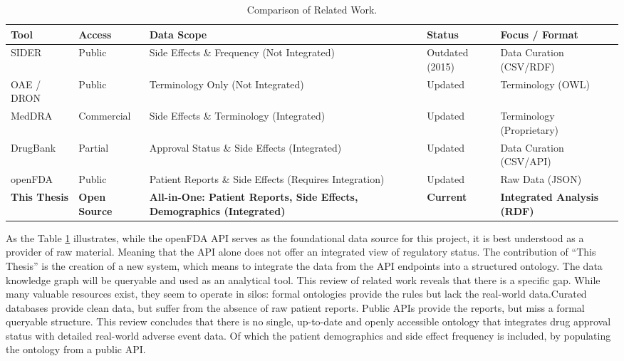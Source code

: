 \begin{table}[htbp]
\centering
\small
\begin{tabular}{|p{1.7cm}|p{2.0cm}|p{3.6cm}|p{1.7cm}|p{2.4cm}|}
\hline
\textbf{Tool} & \textbf{Access} & \textbf{Data Scope} & \textbf{Status} & \textbf{Focus / Format} \\
\hline
SIDER & Public & Side Effects \& Frequency (Not Integrated) & Outdated (2015) & Data Curation (CSV/RDF) \\
\hline
OAE / DRON & Public & Terminology Only (Not Integrated) & Updated & Terminology (OWL) \\
\hline
MedDRA & Commercial & Side Effects \& Terminology (Integrated) & Updated & Terminology (Proprietary) \\
\hline
DrugBank & Partial & Approval Status \& Side Effects (Integrated) & Updated & Data Curation (CSV/API) \\
\hline
openFDA & Public & Patient Reports \& Side Effects (Requires Integration) & Updated & Raw Data (JSON) \\
\hline
\textbf{This Thesis} & \textbf{Open Source} & \textbf{All-in-One: Patient Reports, Side Effects, Demographics (Integrated)} & \textbf{Current} & \textbf{Integrated Analysis (RDF)} \\
\hline
\end{tabular}
\caption{Comparison of Related Work.}
\label{tab:related_work_comparison}
\end{table}

As the Table \ref{tab:related_work_comparison} illustrates, while the openFDA API serves as the foundational data source for this project, it is best understood as a provider of raw material. Meaning that the API alone does not offer an integrated view of regulatory status. The contribution of “This Thesis” is the creation of a new system, which means to integrate the data from the API endpoints into a structured ontology. The data knowledge graph will be queryable and used as an analytical tool.
This review of related work reveals that there is a specific gap. While many valuable resources exist, they seem to operate in silos: formal ontologies provide the rules but lack the real-world data.Curated databases provide clean data, but suffer from the absence of raw patient reports. Public APIs provide the reports, but miss a formal queryable structure. This review concludes that there is no single, up-to-date and openly accessible ontology that integrates drug approval status with detailed real-world adverse event data. Of which the patient demographics and side effect frequency is included, by populating the ontology from a public API. 


